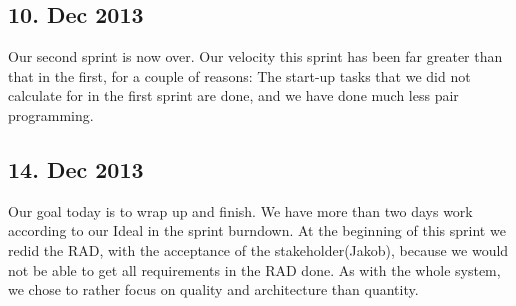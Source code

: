 \subsection{10. Dec 2013}
Our second sprint is now over. Our velocity this sprint has been far greater than that in the first, for a couple of reasons: The start-up tasks that we did not calculate for in the first sprint are done, and we have done much less pair programming.

\subsection{14. Dec 2013}
Our goal today is to wrap up and finish. We have more than two days work according to our Ideal in the sprint burndown. At the beginning of this sprint we redid the RAD, with the acceptance of the stakeholder(Jakob), because we would not be able to get all requirements in the RAD done. As with the whole system, we chose to rather focus on quality and architecture than quantity.